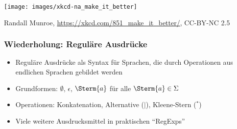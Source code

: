 \documentclass[aspectratio=1610,onlymath]{beamer}
\begin{document}
\maketitle

\begin{frame}\frametitle{}

\texttt{[image: images/xkcd-na\_make\_it\_better]}

{\tiny Randall Munroe, \url{https://xkcd.com/851_make_it_better/}, CC-BY-NC 2.5}

\end{frame}



\begin{frame}\frametitle{Wiederholung: Reguläre Ausdrücke}

\begin{itemize}
\item Reguläre Ausdrücke als Syntax für Sprachen, die durch Operationen aus endlichen Sprachen gebildet werden
\item Grundformen: $\emptyset$, $\epsilon$, $\Sterm{a}$ für alle $\Sterm{a}\in\Sigma$
\item Operationen: Konkatenation, Alternative ($\mid$), Kleene-Stern (${}^*$)
\item Viele weitere Ausdrucksmittel in praktischen "`RegExps"'
\end{itemize}

\end{frame}
\end{document}

